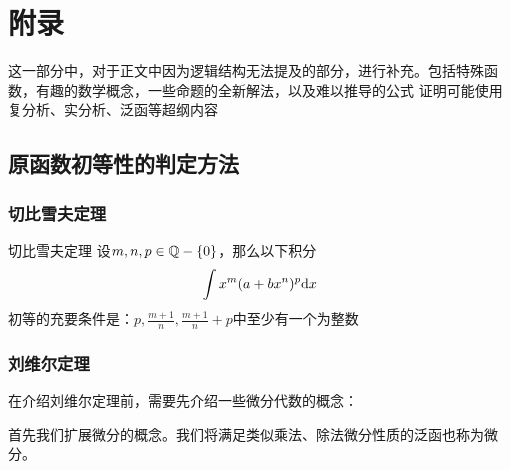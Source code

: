 \documentclass[12pt, a4paper, oneside, UTF8]{ctexbook}
\begin{document}
	\else
	\fi
	\chapter{附录}
	这一部分中，对于正文中因为逻辑结构无法提及的部分，进行补充。包括特殊函数，有趣的数学概念，一些命题的全新解法，以及难以推导的公式
	证明可能使用复分析、实分析、泛函等超纲内容
	
	\section{原函数初等性的判定方法}
		\subsection{切比雪夫定理}
			\begin{them}{切比雪夫定理}{}
				设$m,n,p\in \mathbb{Q}-\{0\}$，那么以下积分
				\begin{equation}
					\int x^m(a+bx^n)^p \mathrm{d} x
				\end{equation}
				初等的充要条件是：$p,\frac{m+1}{n},\frac{m+1}{n}+p$中至少有一个为整数
			\end{them}
		\subsection{刘维尔定理}
			在介绍刘维尔定理前，需要先介绍一些微分代数的概念：
			
			首先我们扩展微分的概念。我们将满足类似乘法、除法微分性质的泛函也称为微分。
			
\end{document}
